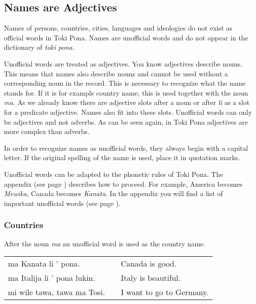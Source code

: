\subsection*{Names are Adjectives}
\label{'unofficial_words_intro'}
%
%
Names of persons, countries, cities, languages and ideologies do not exist as official words in Toki Pona. 
Names are unofficial words and do not appear in the dictionary of \textit{toki pona}.

Unofficial words are treated as adjectives.
You know adjectives describe nouns. 
This means that names also describe nouns and cannot be used without a corresponding noun in the record.
This is necessary to recognize what the name stands for. 
If it is for example country name, this is used together with the noun \textit{ma}. 
As we already know there are adjective slots after a noun or after \textit{li} as a slot for a predicate adjective. 
Names also fit into these slots.
Unofficial words can only be adjectives and not adverbs. 
As can be seen again, in Toki Pona adjectives are more complex than adverbs. 

In order to recognize names as unofficial words, they always begin with a capital letter. 
If the original spelling of the name is used, place it in quotation marks.

Unofficial words can be adapted to the phonetic rules of Toki Pona.
The appendix (see page \pageref{'phonet_trans'}) describes how to proceed.
For example, America becomes \textit{Mewika}, Canada becomes \textit{Kanata}.
In the appendix you will find a list of important unofficial words (see page \pageref{'unofficial_words'}). 
%
\subsubsection*{Countries}
%
After the noun \textit{ma} an unofficial word is used as the country name. 

\begin{supertabular}{p{5,5cm}|ll}
ma Kanata li ' pona. && Canada is good. \\
ma Italija li ' pona lukin. && Italy is beautiful. \\
mi wile tawa, tawa ma Tosi. && I want to go to Germany. \\
\end{supertabular} 

